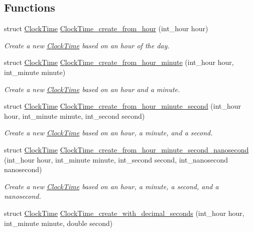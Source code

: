 \subsection*{\-Functions}
\begin{DoxyCompactItemize}
\item 
struct \hyperlink{structClockTime}{\-Clock\-Time} \hyperlink{clock-time_8h_a172dd5f4ae9a67a7d0efe2b7c3e1a7b9}{\-Clock\-Time\-\_\-create\-\_\-from\-\_\-hour} (int\-\_\-hour hour)
\begin{DoxyCompactList}\small\item\em \-Create a new \hyperlink{structClockTime}{\-Clock\-Time} based on an hour of the day. \end{DoxyCompactList}\item 
struct \hyperlink{structClockTime}{\-Clock\-Time} \hyperlink{clock-time_8h_ab1d019479c07792ba3789d4611bf47bd}{\-Clock\-Time\-\_\-create\-\_\-from\-\_\-hour\-\_\-minute} (int\-\_\-hour hour, int\-\_\-minute minute)
\begin{DoxyCompactList}\small\item\em \-Create a new \hyperlink{structClockTime}{\-Clock\-Time} based on an hour and a minute. \end{DoxyCompactList}\item 
struct \hyperlink{structClockTime}{\-Clock\-Time} \hyperlink{clock-time_8h_a1015eecfae508e22c54a4f1b52634fbf}{\-Clock\-Time\-\_\-create\-\_\-from\-\_\-hour\-\_\-minute\-\_\-second} (int\-\_\-hour hour, int\-\_\-minute minute, int\-\_\-second second)
\begin{DoxyCompactList}\small\item\em \-Create a new \hyperlink{structClockTime}{\-Clock\-Time} based on an hour, a minute, and a second. \end{DoxyCompactList}\item 
struct \hyperlink{structClockTime}{\-Clock\-Time} \hyperlink{clock-time_8h_acc3b0e5400f78e25499a815f4068739e}{\-Clock\-Time\-\_\-create\-\_\-from\-\_\-hour\-\_\-minute\-\_\-second\-\_\-nanosecond} (int\-\_\-hour hour, int\-\_\-minute minute, int\-\_\-second second, int\-\_\-nanosecond nanosecond)
\begin{DoxyCompactList}\small\item\em \-Create a new \hyperlink{structClockTime}{\-Clock\-Time} based on an hour, a minute, a second, and a nanosecond. \end{DoxyCompactList}\item 
struct \hyperlink{structClockTime}{\-Clock\-Time} \hyperlink{clock-time_8h_a519b7c6074cf1addc815f7495048c30b}{\-Clock\-Time\-\_\-create\-\_\-with\-\_\-decimal\-\_\-seconds} (int\-\_\-hour hour, int\-\_\-minute minute, double second)

\end{DoxyCompactItemize}

